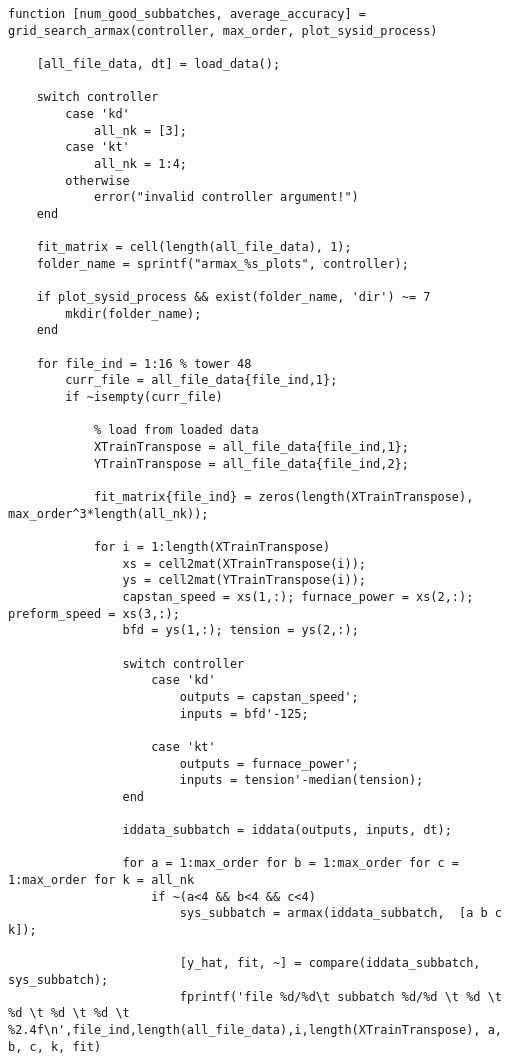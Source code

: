 \begin{lstlisting}
function [num_good_subbatches, average_accuracy] = grid_search_armax(controller, max_order, plot_sysid_process)

    [all_file_data, dt] = load_data();
    
    switch controller
        case 'kd'
            all_nk = [3];
        case 'kt'
            all_nk = 1:4;
        otherwise
            error("invalid controller argument!")
    end
    
    fit_matrix = cell(length(all_file_data), 1);
    folder_name = sprintf("armax_%s_plots", controller);
    
    if plot_sysid_process && exist(folder_name, 'dir') ~= 7
        mkdir(folder_name);
    end
    
    for file_ind = 1:16 % tower 48
        curr_file = all_file_data{file_ind,1};
        if ~isempty(curr_file)
    
            % load from loaded data
            XTrainTranspose = all_file_data{file_ind,1};
            YTrainTranspose = all_file_data{file_ind,2};
    
            fit_matrix{file_ind} = zeros(length(XTrainTranspose), max_order^3*length(all_nk));
    
            for i = 1:length(XTrainTranspose)
                xs = cell2mat(XTrainTranspose(i));
                ys = cell2mat(YTrainTranspose(i));
                capstan_speed = xs(1,:); furnace_power = xs(2,:); preform_speed = xs(3,:);
                bfd = ys(1,:); tension = ys(2,:);
    
                switch controller
                    case 'kd'
                        outputs = capstan_speed';
                        inputs = bfd'-125;
    
                    case 'kt'
                        outputs = furnace_power';
                        inputs = tension'-median(tension);
                end
    
                iddata_subbatch = iddata(outputs, inputs, dt);
    
                for a = 1:max_order for b = 1:max_order for c = 1:max_order for k = all_nk
                    if ~(a<4 && b<4 && c<4)
                        sys_subbatch = armax(iddata_subbatch,  [a b c k]);
    
                        [y_hat, fit, ~] = compare(iddata_subbatch, sys_subbatch);
                        fprintf('file %d/%d\t subbatch %d/%d \t %d \t %d \t %d \t %d \t %2.4f\n',file_ind,length(all_file_data),i,length(XTrainTranspose), a, b, c, k, fit)
    

\end{lstlisting}
